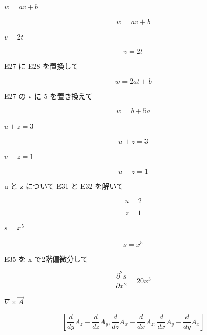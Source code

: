 \documentclass[dvipdfmx,a4paper,11pt]{jsarticle}
\begin{document}
$w = a v + b$

\begin{equation}
  w = a v + b
  \label{eq:E27}
\end{equation}

$v = 2 t$

\begin{equation}
  v = 2 t
  \label{eq:E28}
\end{equation}

E27 に E28 を置換して

\begin{equation}
  w = 2 a t+b
  \label{eq:E29}
\end{equation}

E27 の v に 5 を置き換えて

\begin{equation}
  w = b+5 a
  \label{eq:E30}
\end{equation}

$u + z = 3$

\begin{equation}
  u + z = 3
  \label{eq:E31}
\end{equation}

$u - z = 1$

\begin{equation}
  u - z = 1
  \label{eq:E32}
\end{equation}

u と z について E31 と E32 を解いて

\begin{equation}
  u = 2
  \label{eq:E33}
\end{equation}

\begin{equation}
  z = 1
  \label{eq:E34}
\end{equation}

$s = x^5$

\begin{equation}
  s = x^5
  \label{eq:E35}
\end{equation}

E35 を x で2階偏微分して

\begin{equation}
  \frac{\partial^{2} s}{\partial x^{2}} = 20 x^3
  \label{eq:E36}
\end{equation}

$\nabla \times \vec{A}$

\begin{equation}
  \left[ \frac{d}{d y} A_{z}-\frac{d}{d z} A_{y} , \frac{d}{d z} A_{x}-\frac{d}{d x} A_{z} , \frac{d}{d x} A_{y}-\frac{d}{d y} A_{x} \right]
  \label{eq:E37}
\end{equation}
\end{document}
